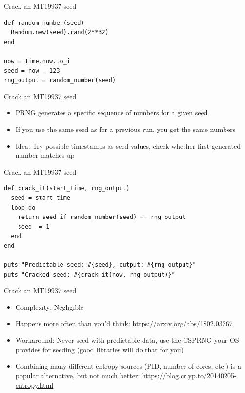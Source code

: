 \documentclass[presentation]{beamer}
\begin{document}
\begin{frame}[fragile,label={sec:orgbc5405b}]{Crack an MT19937 seed}
 \begin{verbatim}
def random_number(seed)
  Random.new(seed).rand(2**32)
end

now = Time.now.to_i
seed = now - 123
rng_output = random_number(seed)
\end{verbatim}
\end{frame}

\begin{frame}[label={sec:org7990742}]{Crack an MT19937 seed}
\begin{itemize}
\item PRNG generates a specific sequence of numbers for a given seed
\item If you use the same seed as for a previous run, you get the same numbers
\item Idea: Try possible timestamps as seed values, check whether
first generated number matches up
\end{itemize}
\end{frame}

\begin{frame}[fragile,label={sec:orgf13ad9d}]{Crack an MT19937 seed}
 \begin{verbatim}
def crack_it(start_time, rng_output)
  seed = start_time
  loop do
    return seed if random_number(seed) == rng_output
    seed -= 1
  end
end

puts "Predictable seed: #{seed}, output: #{rng_output}"
puts "Cracked seed: #{crack_it(now, rng_output)}"
\end{verbatim}
\end{frame}

\begin{frame}[label={sec:org4aec501}]{Crack an MT19937 seed}
\begin{itemize}
\item Complexity: Negligible
\item Happens more often than you'd think:
\url{https://arxiv.org/abs/1802.03367}
\item Workaround: Never seed with predictable data, use the CSPRNG your OS
provides for seeding (good libraries will do that for you)
\item Combining many different entropy sources (PID, number of cores,
etc.) is a popular alternative, but not much better:
\url{https://blog.cr.yp.to/20140205-entropy.html}
\end{itemize}
\end{frame}
\end{document}
